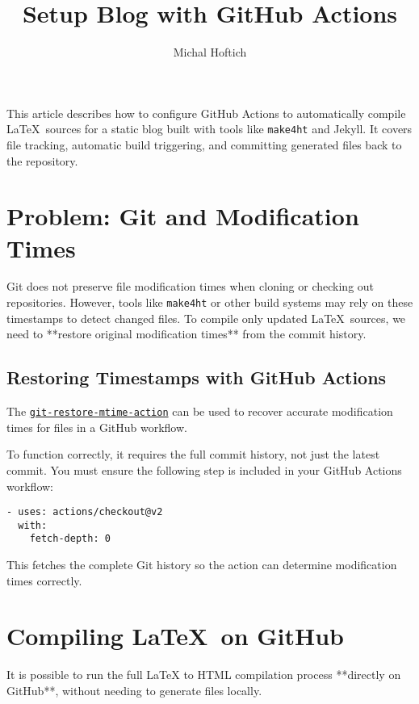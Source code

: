 \documentclass{article}
\title{Setup Blog with GitHub Actions}
\author{Michal Hoftich}
\def\makeht{\texttt{make4ht}}
\begin{document}
\maketitle

This article describes how to configure GitHub Actions to automatically compile \LaTeX\ sources
for a static blog built with tools like \makeht{} and Jekyll. It covers file tracking,
automatic build triggering, and committing generated files back to the repository.

\tableofcontents

\section{Problem: Git and Modification Times}

Git does not preserve file modification times when cloning or checking out repositories.  
However, tools like \makeht{} or other build systems may rely on these timestamps to detect changed files.  
To compile only updated \LaTeX\ sources, we need to **restore original modification times** 
from the commit history.

\subsection{Restoring Timestamps with GitHub Actions}

The 
\href{https://github.com/chetan/git-restore-mtime-action}{\texttt{git-restore-mtime-action}} 
can be used to recover accurate modification times for files in a GitHub workflow.

To function correctly, it requires the full commit history, not just the latest commit.
You must ensure the following step is included in your GitHub Actions workflow:

\begin{verbatim}
- uses: actions/checkout@v2
  with:
    fetch-depth: 0
\end{verbatim}

This fetches the complete Git history so the action can determine modification times correctly.

\section{Compiling \LaTeX\ on GitHub}

It is possible to run the full \LaTeX{} to HTML compilation process **directly on GitHub**, 
without needing to generate files locally.
\end{document}
